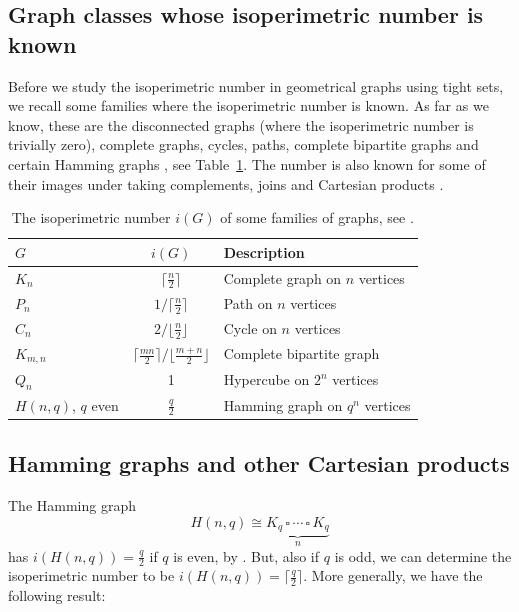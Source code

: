\documentclass[a4paper,11pt]{article}
\theoremstyle{definition}
\newcommand{\cartesianproduct}{\,\square\,}
\begin{document}
\subsection{Graph classes whose isoperimetric number is known}

Before we study the isoperimetric number in geometrical graphs using tight sets, we recall some families where the isoperimetric number is known. As far as we know, these are the disconnected graphs (where the isoperimetric number is trivially zero), complete graphs, cycles, paths, complete bipartite graphs and certain Hamming graphs \cite{M1989}, see Table~\ref{tab:exactnumber}. The number is also known for some of their images under taking complements, joins and Cartesian products \cite{Aslan2013}.

\begin{table}[H]
\renewcommand{\arraystretch}{1.5}
    \centering
    \begin{tabular}{l|c|l}
        \(G\) & \(i(G)\) & Description\\
        \hline\hline
        \(K_n\) & \(\lceil \frac{n}2\rceil\) & Complete graph on \(n\) vertices\\
        \(P_n\) & \(1/\lceil\frac{n}2\rceil\) & Path on \(n\) vertices\\
        \(C_n\) & \(2/\lfloor\frac{n}2\rfloor\) & Cycle on \(n\) vertices\\
        \(K_{m,n}\) & \(\lceil\frac{mn}2\rceil/\lfloor\frac{m+n}2\rfloor\) & Complete bipartite graph\\
        \(Q_n\) & 1 & Hypercube on \(2^n\) vertices\\
        \(H(n,q)\), \(q\) even & \(\frac{q}2\) & Hamming graph on \(q^n\) vertices
    \end{tabular}
    \caption{The isoperimetric number \(i(G)\) of some families of graphs, see \cite{M1989}.}
    \label{tab:exactnumber}
\end{table}


\subsection{Hamming graphs and other Cartesian products}\label{sec:hamming}
The Hamming graph \[H(n,q)\cong \underbrace{K_q\cartesianproduct\cdots\cartesianproduct K_q}_{n}\] has \(i(H(n,q))=\frac{q}2\) if \(q\) is even, by \cite[Theorem~5.1]{M1989}. But, also if \(q\) is odd, we can determine the isoperimetric number to be $i(H(n,q)) = \lceil\frac{q}{2}\rceil$. More generally, we have the following result: 
\end{document}
